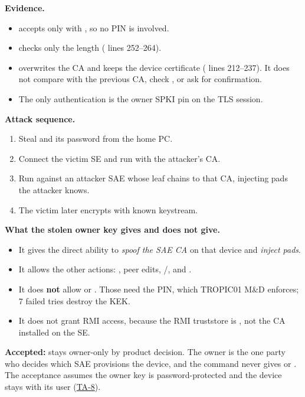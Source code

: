 \documentclass[11pt,a4paper]{article}
\begin{document}
\textbf{Evidence.}
\begin{itemize}
\item {} accepts  only with , so no PIN is involved.
\item {} checks only the length ( lines 252--264).
\item {} overwrites the CA and keeps the device certificate ( lines 212--237). It does not compare with the previous CA, check , or ask for confirmation.
\item The only authentication is the owner SPKI pin on the  TLS session.
\end{itemize}
\textbf{Attack sequence.}
\begin{enumerate}
\item Steal  and its password from the home PC.
\item Connect the victim SE and run  with the attacker's CA.
\item Run  against an attacker SAE whose leaf chains to that CA, injecting pads the attacker knows.
\item The victim later encrypts with known keystream.
\end{enumerate}
\textbf{What the stolen owner key gives and does not give.}
\begin{itemize}
\item It gives the direct ability to \emph{spoof the SAE CA} on that device and \emph{inject pads}.
\item It allows the other  actions: , peer edits, /, and .
\item It does \textbf{not} allow  or . Those need the PIN, which TROPIC01 M\&D enforces; 7 failed tries destroy the KEK.
\item It does not grant RMI access, because the RMI truststore is , not the CA installed on the SE.
\end{itemize}
\textbf{Accepted:}  stays owner-only by product decision. The owner is the one party who decides which SAE provisions the device, and the command never gives  or . The acceptance assumes the owner key is password-protected and the device stays with its user (\hyperref[ta:TA-8]{TA-8}).
\end{document}
